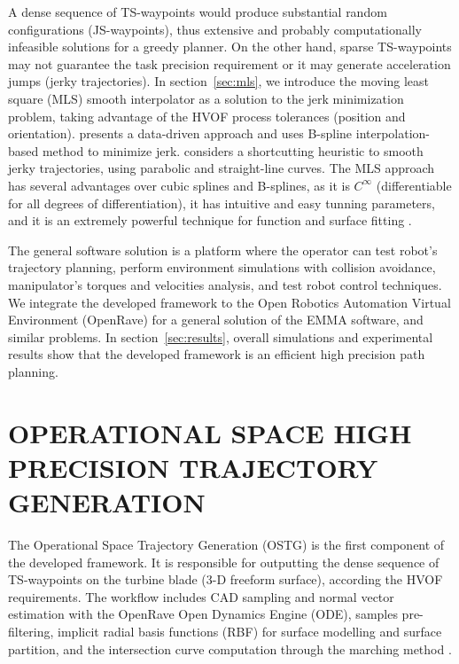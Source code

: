 \documentclass[letterpaper, 10 pt, conference]{ieeeconf}  %
\begin{document}
A dense sequence of TS-waypoints would produce substantial random configurations
(JS-waypoints), thus extensive and probably computationally infeasible solutions
for a greedy planner. On the other hand, sparse TS-waypoints may not guarantee
the task precision requirement or it may generate acceleration jumps (jerky
trajectories). In section~\ref{sec:mls}, we introduce the moving least square
(MLS) smooth interpolator as a solution to the jerk minimization problem, taking
advantage of the HVOF process tolerances (position and orientation). \cite{c10}
presents a data-driven approach and uses B-spline interpolation-based method to
minimize jerk. \cite{c11} considers a shortcutting heuristic to smooth jerky
trajectories, using parabolic and straight-line curves. The MLS approach has
several advantages over cubic splines and B-splines, as it is $C^\infty$
(differentiable for all degrees of differentiation), it has intuitive and easy
tunning parameters, and it is an extremely powerful technique for function and
surface fitting \cite{c11}.

The general software solution is a platform where the operator can test
robot's trajectory planning, perform environment simulations with collision
avoidance, manipulator's torques and velocities analysis, and test robot control
techniques. We integrate the developed framework to the Open
Robotics Automation Virtual Environment (OpenRave) \cite{c12} for a general
solution of the EMMA software, and similar problems. In
section~\ref{sec:results}, overall simulations and experimental results show
that the developed framework is an efficient high precision path planning.

\section{OPERATIONAL SPACE HIGH PRECISION TRAJECTORY GENERATION}\label{sec:rbf}
The Operational Space Trajectory Generation (OSTG) is the first component of the
developed framework. It is responsible for outputting the dense sequence of
TS-waypoints on the turbine blade (3-D freeform surface), according the HVOF
requirements. The workflow includes CAD sampling and normal vector estimation
with the OpenRave Open Dynamics Engine (ODE), samples pre-filtering, implicit
radial basis functions (RBF) for surface modelling \cite{c14} and surface
partition, and the intersection curve computation through the marching method
\cite{c15}.
\end{document}
